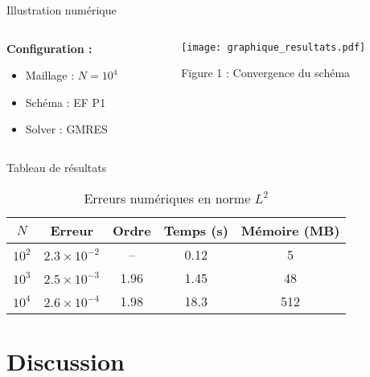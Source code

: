 \documentclass[11pt, aspectratio=169, xcolor={svgnames}]{beamer}
\theoremstyle{definition}
\begin{document}
\begin{frame}{Illustration numérique}
  \begin{columns}[T]
    \begin{column}{0.48\textwidth}
      \textbf{Configuration :}
      \begin{itemize}
        \item Maillage : $N = 10^4$
        \item Schéma : EF P1
        \item Solver : GMRES
      \end{itemize}
    \end{column}

    \begin{column}{0.48\textwidth}
      \begin{center}
        \texttt{[image: graphique\_resultats.pdf]}
      \end{center}
      \scriptsize Figure 1 : Convergence du schéma
    \end{column}
  \end{columns}
\end{frame}

\begin{frame}{Tableau de résultats}
  \begin{table}
    \centering
    \caption{Erreurs numériques en norme $L^2$}
    \begin{tabular}{@{}ccccc@{}}
      \toprule
      $N$ & Erreur & Ordre & Temps (s) & Mémoire (MB) \\
      \midrule
      $10^2$ & $2.3 \times 10^{-2}$ & -- & 0.12 & 5 \\
      $10^3$ & $2.5 \times 10^{-3}$ & 1.96 & 1.45 & 48 \\
      $10^4$ & $2.6 \times 10^{-4}$ & 1.98 & 18.3 & 512 \\
      \bottomrule
    \end{tabular}
  \end{table}
\end{frame}

\section{Discussion}
\end{document}
